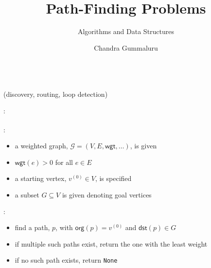 \documentclass[mathserif, handout]{beamer}
\title{Path-Finding Problems}
\subtitle{Algorithms and Data Structures}
\author[C. Gummaluru]{Chandra Gummaluru}
\institute[]{\url{chandra-gummaluru.github.io} }
\date[Algorithms and Data Structures]{}
\begin{document}
\begin{frame}
  \maketitle
\end{frame}

\begin{frame}
  \begin{center}
    \Large {}\\[1mm]
    \normalsize\color{gray} (discovery, routing, loop detection)
  \end{center}
\end{frame}

\begin{frame}
  \begin{thmbox}
    : \\
     \\[2mm]
    :
    \begin{itemize}
      \item a weighted graph, $\mathcal{G} = (V,E, \textsf{wgt},\dots)$, is given
      \item $\textsf{wgt}(e) > 0$ for all $e \in E$
      \item a starting vertex, $v^{(0)} \in V$, is specified
      \item a subset $G \subseteq V$ is given denoting goal vertices
    \end{itemize}

    :
    \begin{itemize}
      \item find a path, $p$, with $\textsf{org}(p) = v^{(0)}$ and $\textsf{dst}(p) \in G$
      \item if multiple such paths exist, return the one with the least weight
      \item if no such path exists, return \texttt{None}
    \end{itemize}

  \end{thmbox}
\end{frame}
\end{document}
